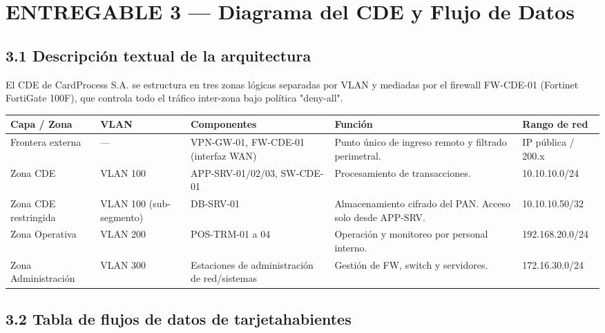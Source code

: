 \documentclass[11pt,a4paper]{article}
\begin{document}
\clearpage

\section{ENTREGABLE 3 — Diagrama del CDE y Flujo de Datos}

\subsection{3.1 Descripción textual de la arquitectura}

El CDE de CardProcess S.A. se estructura en tres zonas lógicas separadas por VLAN y mediadas por el firewall FW-CDE-01 (Fortinet FortiGate 100F), que controla todo el tráfico inter-zona bajo política "deny-all".

\begin{tabularx}{\textwidth}{P{2cm}P{2.5cm}P{2.5cm}P{2cm}L}
\toprule
\textbf{Capa / Zona} & \textbf{VLAN} & \textbf{Componentes} & \textbf{Función} & \textbf{Rango de red} \\
\midrule
Frontera externa & — & VPN-GW-01, FW-CDE-01 (interfaz WAN) & Punto único de ingreso remoto y filtrado perimetral. & IP pública / 200.x \\
Zona CDE & VLAN 100 & APP-SRV-01/02/03, SW-CDE-01 & Procesamiento de transacciones. & 10.10.10.0/24 \\
Zona CDE restringida & VLAN 100 (sub-segmento) & DB-SRV-01 & Almacenamiento cifrado del PAN. Acceso solo desde APP-SRV. & 10.10.10.50/32 \\
Zona Operativa & VLAN 200 & POS-TRM-01 a 04 & Operación y monitoreo por personal interno. & 192.168.20.0/24 \\
Zona Administración & VLAN 300 & Estaciones de administración de red/sistemas & Gestión de FW, switch y servidores. & 172.16.30.0/24 \\
\bottomrule
\end{tabularx}

\subsection{3.2 Tabla de flujos de datos de tarjetahabientes}
\end{document}
